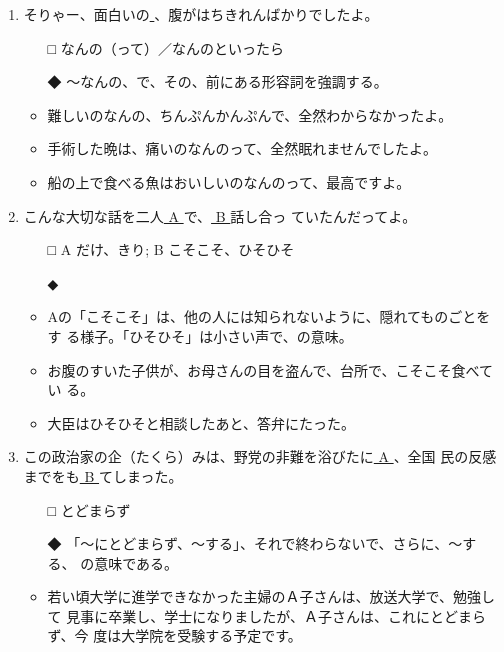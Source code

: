\documentclass[
uplatex,
b5paper,
10pt,
dvipdfmx
]{jsbook}
\begin{document}
\begin{enumerate}
\item そりゃー、面白いの\underline{    }、腹がはちきれんばかりでしたよ。
\begin{itemize}
\item[□] なんの（って）／なんのといったら
\item[◆] 〜なんの、で、その、前にある形容詞を強調する。
\end{itemize}
\begin{itemize}
\item 難しいのなんの、ちんぷんかんぷんで、全然わからなかったよ。
\item 手術した晩は、痛いのなんのって、全然眠れませんでしたよ。
\item 船の上で食べる魚はおいしいのなんのって、最高ですよ。
\end{itemize}

\item こんな大切な話を二人\underline{ A }で、\underline{ B }話し合っ
      ていたんだってよ。

\begin{itemize}
\itemsep=-4pt
\item[□] A だけ、きり; B こそこそ、ひそひそ
\item[◆] 
\end{itemize}
\begin{itemize}
\item Aの「こそこそ」は、他の人には知られないように、隠れてものごとをす
      る様子。「ひそひそ」は小さい声で、の意味。
\item お腹のすいた子供が、お母さんの目を盗んで、台所で、こそこそ食べてい
      る。
\item 大臣はひそひそと相談したあと、答弁にたった。
\end{itemize}

\item この政治家の企（たくら）みは、野党の非難を浴びたに\underline{ A }、全国
      民の反感までをも\underline{ B }てしまった。
\begin{itemize}
\item[□] とどまらず
\item[◆] 「〜にとどまらず、〜する」、それで終わらないで、さらに、〜する、
	  の意味である。
\end{itemize}
\begin{itemize}
\item 若い頃大学に進学できなかった主婦のＡ子さんは、放送大学で、勉強して
      見事に卒業し、学士になりましたが、Ａ子さんは、これにとどまらず、今
      度は大学院を受験する予定です。
\end{itemize}


\end{enumerate}
\end{document}
